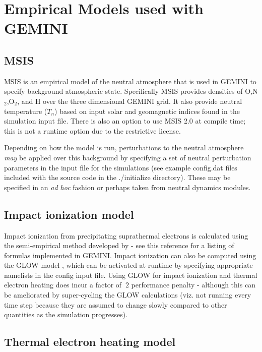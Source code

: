 \documentclass[11pt,letterpaper]{article}
\begin{document}
\section{Empirical Models used with GEMINI}

\subsection{MSIS}

MSIS is an empirical model of the neutral atmosphere \citep{Picone:2002} that is used in GEMINI to specify background atmospheric state.  Specifically MSIS provides densities of O,N$_2$,O$_2$, and H over the three dimensional GEMINI grid.  It also provide neutral temperature ($T_n$) based on input solar and geomagnetic indices found in the simulation input file.  There is also an option to use MSIS 2.0 at compile time; this is not a runtime option due to the restrictive license.  

Depending on how the model is run, perturbations to the neutral atmosphere \emph{may} be applied over this background by specifying a set of neutral perturbation parameters in the input file for the simulations (see example config.dat files included with the source code in the ./initialize directory).  These may be specified in an \emph{ad hoc} fashion or perhaps taken from neutral dynamics modules.  


\subsection{Impact ionization model} \label{sec:impact}

Impact ionization from precipitating suprathermal electrons is calculated using the semi-empirical method developed by \citet{Fang:2008, Fang:2010} - see this reference for a listing of formulas implemented in GEMINI.  Impact ionization can also be computed using the GLOW model \citep{Solomon:2017}, which can be activated at runtime by specifying appropriate namelists in the config input file.  Using GLOW for impact ionization and thermal electron heating does incur a factor of $~2$ performance penalty - although this can be ameliorated by super-cycling the GLOW calculations (viz. not running every time step because they are assumed to change slowly compared to other quantities as the simulation progresses).  

\subsection{Thermal electron heating model}
\end{document}
